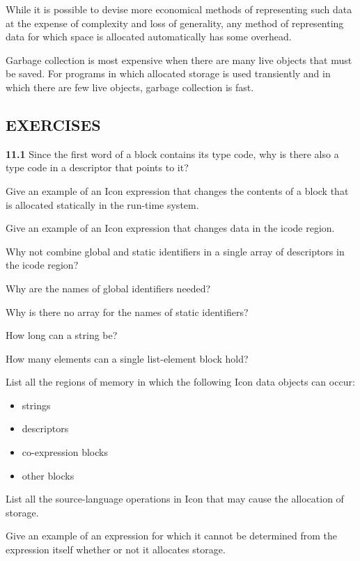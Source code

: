While it is possible to devise more economical methods of representing
such data at the expense of complexity and loss of generality, any
method of representing data for which space is allocated automatically
has some overhead.

Garbage collection is most expensive when there are many live objects
that must be saved. For programs in which allocated storage is used
transiently and in which there are few live objects, garbage
collection is fast.

\subsection{EXERCISES}

{\bf 11.1} Since the first word of a block contains its type code, why is
there also a type code in a descriptor that points to it?

 Give an example of an Icon expression that
changes the contents of a block that is allocated statically in the
run-time system.

 Give an example of an Icon expression that
changes data in the icode region.

 Why not combine global and static identifiers in
a single array of descriptors in the icode region?

 Why are the names of global identifiers needed?

 Why is there no array for the names of static identifiers?

 How long can a string be?

 How many elements can a single list-element block
hold?

 List all the regions of memory in which the
following Icon data objects can occur:
\begin{itemize}
\item 
strings
\item 
descriptors
\item 
co-expression blocks
\item 
other blocks
\end{itemize}

 List all the source-language operations in Icon
that may cause the allocation of storage.

 Give an example of an expression for which it
cannot be determined from the expression itself whether or not it
allocates storage.

